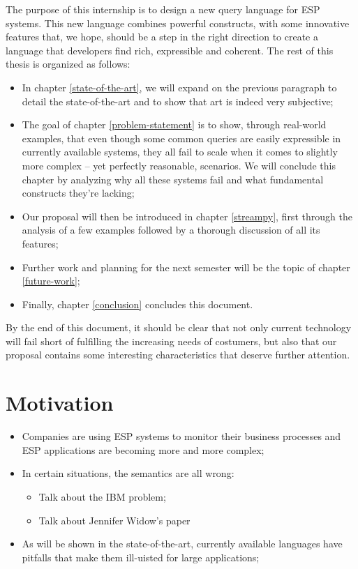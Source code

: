 \documentclass{report}
\begin{document}
The purpose of this internship is to design a new query language for ESP systems. This new language combines powerful constructs, with some innovative features that, we hope, should be a step in the right direction to create a language that developers find rich, expressible and coherent. The rest of this thesis is organized as follows:

\begin{itemize}
\item In chapter \ref{state-of-the-art}, we will expand on the previous paragraph to detail the state-of-the-art and to show that art is indeed very subjective;
\item The goal of chapter \ref{problem-statement} is to show, through real-world examples, that even though some common queries are easily expressible in currently available systems, they all fail to scale when it comes to slightly more complex -- yet perfectly reasonable, scenarios. We will conclude this chapter by analyzing why all these systems fail and what fundamental constructs they're lacking;
\item Our proposal will then be introduced in chapter \ref{streampy}, first through the analysis of a few examples followed by a thorough discussion of all its features;
\item Further work and planning for the next semester will be the topic of chapter \ref{future-work};
\item Finally, chapter \ref{conclusion} concludes this document.
\end{itemize}

By the end of this document, it should be clear that not only current technology will fail short of fulfilling the increasing needs of costumers, but also that our proposal contains some interesting characteristics that deserve further attention.

\section{Motivation}



\begin{itemize}
\item Companies are using ESP systems to monitor their business processes and ESP applications are becoming more and more complex;
\item In certain situations, the semantics are all wrong:
  \begin{itemize}
  \item Talk about the IBM problem;
  \item Talk about Jennifer Widow's paper
  \end{itemize}
\item As will be shown in the state-of-the-art, currently available languages have pitfalls that make them ill-uisted for large applications;
\end{itemize}
\end{document}
